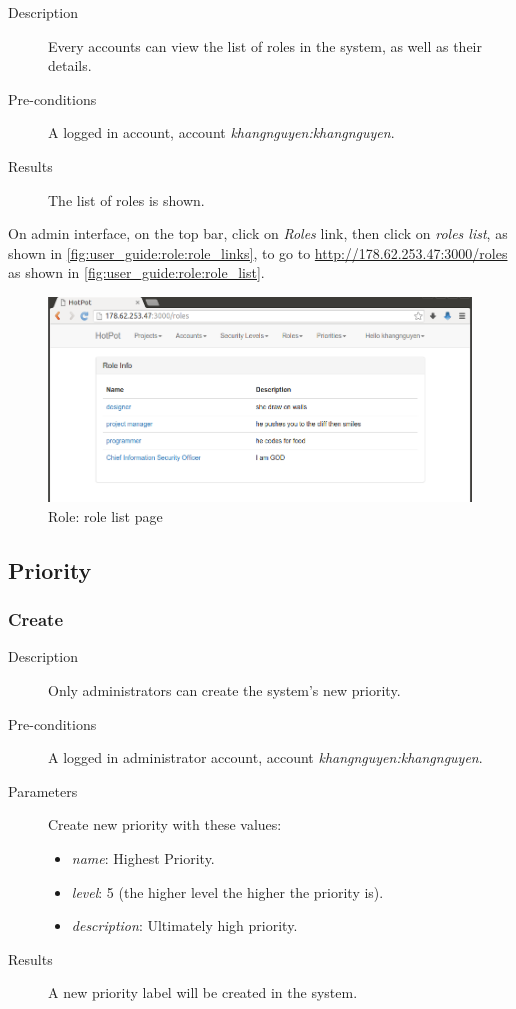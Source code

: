 \begin{description}
\item[Description] Every accounts can view the list of roles in the system, as well as their details.
\item[Pre-conditions] A logged in account, \eg account \emph{khangnguyen:khangnguyen}.
\item[Results] The list of roles is shown.
\end{description}

On admin interface, on the top bar, click on \emph{Roles} link, then click on \emph{roles list}, as shown in \autoref{fig:user_guide:role:role_links}, 
to go to \href{http://178.62.253.47:3000/roles}{http://178.62.253.47:3000/roles} as shown in \autoref{fig:user_guide:role:role_list}.

\begin{figure}[bth]
\myfloatalign
\includegraphics[width=1.0\linewidth]{gfx/chapter_5/role/role_list}
\caption[Role: role list page]{Role: role list page}
\label{fig:user_guide:role:role_list}
\end{figure}

\subsection{Priority}
\label{ch:appendix-a:user_guide:priority}
\subsubsection{Create}
\label{ch:appendix-a:user_guide:priority:create}

\begin{description}
\item[Description] Only administrators can create the system's new priority.
\item[Pre-conditions] A logged in administrator account, \eg account \emph{khangnguyen:khangnguyen}.
\item[Parameters] Create new priority with these values:
\begin{itemize}
\item \emph{name}: Highest Priority.
\item \emph{level}: 5 (the higher level the higher the priority is).
\item \emph{description}: Ultimately high priority.
\end{itemize}
\item[Results] A new priority label will be created in the system.
\end{description}

